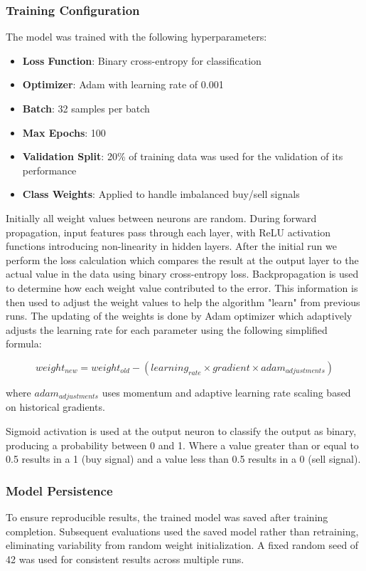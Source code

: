 \documentclass[a4paper,12pt]{article}
\begin{document}
\subsubsection{Training Configuration}
The model was trained with the following hyperparameters:
\begin{itemize}
\item \textbf{Loss Function}: Binary cross-entropy for classification
\item \textbf{Optimizer}: Adam with learning rate of 0.001
\item \textbf{Batch}: 32 samples per batch
\item \textbf{Max Epochs}: 100
\item \textbf{Validation Split}: 20\% of training data was used for the validation of its performance
\item \textbf{Class Weights}: Applied to handle imbalanced buy/sell signals
\end{itemize}

Initially all weight values between neurons are random. During forward propagation, input features pass through each layer, with ReLU activation functions introducing non-linearity in hidden layers. After the initial run we perform the loss calculation which compares the result at the output layer to the actual value in the data using binary cross-entropy loss. Backpropagation is used to determine how each weight value contributed to the error. This information is then used to adjust the weight values to help the algorithm "learn" from previous runs. The updating of the weights is done by Adam optimizer which adaptively adjusts the learning rate for each parameter using the following simplified formula:

\begin{equation}
{weight_{new}} =  weight_{old} - (learning_{rate} \times gradient \times adam_{adjustments})
\end{equation}

where $adam_{adjustments}$ uses momentum and adaptive learning rate scaling based on historical gradients.

Sigmoid activation is used at the output neuron to classify the output as binary, producing a probability between 0 and 1. Where a value greater than or equal to 0.5 results in a 1 (buy signal) and a value less than 0.5 results in a 0 (sell signal).

\subsubsection{Model Persistence}
To ensure reproducible results, the trained model was saved after training completion. Subsequent evaluations used the saved model rather than retraining, eliminating variability from random weight initialization. A fixed random seed of 42 was used for consistent results across multiple runs.
\end{document}
